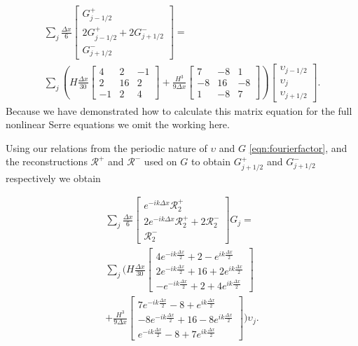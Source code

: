 \begin{multline*}
\sum_j \frac{\Delta x}{6}\begin{bmatrix} G^+_{j -1/2} \\2 G^+_{j -1/2}+2 G^-_{j +1/2} \\ G^-_{j +1/2} \end{bmatrix} = \\\sum_j \left(H\frac{\Delta x}{30}\begin{bmatrix} 4 &2 &-1 \\2 &16 &2  \\-1 &2 &4 \end{bmatrix} + \frac{H^3 }{9\Delta x}\begin{bmatrix} 7 &-8 &1  \\-8 &16 &-8  \\1 &-8 &7  \end{bmatrix} \right) \begin{bmatrix} \upsilon_{j -1/2} \\\upsilon_{j} \\ \upsilon_{j +1/2} \end{bmatrix}.
\end{multline*}
Because we have demonstrated how to calculate this matrix equation for the full nonlinear Serre equations we omit the working here.

 Using our relations from the periodic nature of $\upsilon$ and $G$ \eqref{eqn:fourierfactor}, and the reconstructions $\mathcal{R}^+$ and $\mathcal{R}^-$ used on $G$ to obtain $G^+_{j +1/2}$ and $G^-_{j +1/2}$ respectively we obtain
 
 \begin{multline*}
 \sum_j \frac{\Delta x}{6}\begin{bmatrix} e^{-ik\Delta x} \mathcal{R}^+_2 \\2 e^{-ik\Delta x} \mathcal{R}^+_2 +2 \mathcal{R}^-_2 \\ \mathcal{R}^-_2 \end{bmatrix} G_j = \\\sum_j \Bigg(H\frac{\Delta x}{30}\begin{bmatrix} 4e^{-ik\frac{\Delta x}{2}} +  2 - e^{ik\frac{\Delta x}{2}}\\2e^{-ik\frac{\Delta x}{2}}  + 16  +2 e^{ik\frac{\Delta x}{2}}  \\ -e^{-ik\frac{\Delta x}{2}} +  2 + 4e^{ik\frac{\Delta x}{2}} \end{bmatrix} \\+ \frac{H^3 }{9\Delta x}\begin{bmatrix} 7e^{-ik\frac{\Delta x}{2}} -8 + e^{ik\frac{\Delta x}{2}} \\ -8e^{-ik\frac{\Delta x}{2}} +  16  -8e^{ik\frac{\Delta x}{2}} \\ e^{-ik\frac{\Delta x}{2}} -8 + 7e^{ik\frac{\Delta x}{2}} \end{bmatrix}  \Bigg) \upsilon_j.
 \end{multline*}
 
